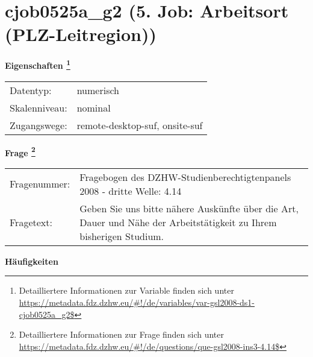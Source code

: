 
    \setcounter{footnote}{0}

    \vspace*{-1.8cm}
	\section{cjob0525a\_g2 (5. Job: Arbeitsort (PLZ-Leitregion))}
	\label{section:cjob0525a_g2}



    \vspace*{0.5cm}
    \noindent\textbf{Eigenschaften
	\footnote{Detailliertere Informationen zur Variable finden sich unter
		\url{https://metadata.fdz.dzhw.eu/\#!/de/variables/var-gsl2008-ds1-cjob0525a_g2$}}}\\
	\begin{tabularx}{\hsize}{@{}lX}
	Datentyp: & numerisch \\
	Skalenniveau: & nominal \\
	Zugangswege: &
	  remote-desktop-suf, 
	  onsite-suf
 \\
    \end{tabularx}



				\vspace*{0.5cm}
                \noindent\textbf{Frage
	                \footnote{Detailliertere Informationen zur Frage finden sich unter
		              \url{https://metadata.fdz.dzhw.eu/\#!/de/questions/que-gsl2008-ins3-4.14$}}}\\
				\begin{tabularx}{\hsize}{@{}lX}
					Fragenummer: &
					  Fragebogen des DZHW-Studienberechtigtenpanels 2008 - dritte Welle:
					  4.14
 \\
					Fragetext: & Geben Sie uns bitte nähere Auskünfte über die Art, Dauer und Nähe der Arbeitstätigkeit zu Ihrem bisherigen Studium. \\
				\end{tabularx}





        		\vspace*{0.5cm}
                \noindent\textbf{Häufigkeiten}

